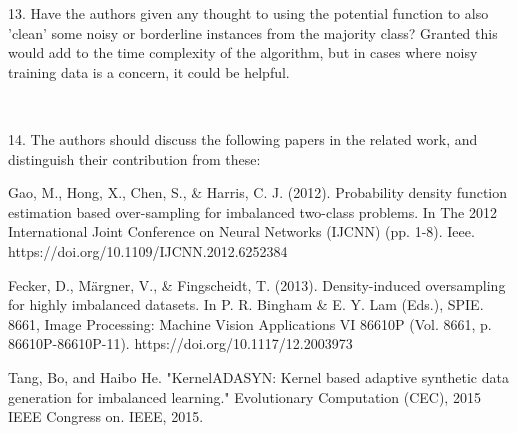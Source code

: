 \documentclass{article}
\begin{document}
\color{red}
{13. Have the authors given any thought to using the potential function to also 'clean' some noisy or borderline instances from the majority class? Granted this would add to the time complexity of the algorithm, but in cases where noisy training data is a concern, it could be helpful.}

\color{blue}{

It is an interesting notion that we did not previously consider, so thank you for that suggestion. Indeed, class potential could be, in principle, used for data cleaning, perhaps even without the associated oversampling. It seems like an interesting direction for further research that we will try to explore.}\\


\color{red}
{14. The authors should discuss the following papers in the related work, and distinguish their contribution from these:

Gao, M., Hong, X., Chen, S., \& Harris, C. J. (2012). Probability density function estimation based over-sampling for imbalanced two-class problems. In The 2012 International Joint Conference on Neural Networks (IJCNN) (pp. 1-8). Ieee. https://doi.org/10.1109/IJCNN.2012.6252384

Fecker, D., Märgner, V., \& Fingscheidt, T. (2013). Density-induced oversampling for highly imbalanced datasets. In P. R. Bingham \& E. Y. Lam (Eds.), SPIE. 8661, Image Processing:      Machine Vision Applications VI 86610P (Vol. 8661, p. 86610P-86610P-11). https://doi.org/10.1117/12.2003973

Tang, Bo, and Haibo He. "KernelADASYN: Kernel based adaptive synthetic data generation for imbalanced learning." Evolutionary Computation (CEC), 2015 IEEE Congress on. IEEE, 2015.
}

\color{blue}{
We are thankful for these suggestions and added them to our list of references. We have discussed them in details in Section 3.1, pointing to both their advantages, as well as shortcomings that are addressed by our proposed RBO methodology. This will help to emphasize our reasonings behind designing our RBO method and how it advances the current oversampling approaches.}\\
\end{document}
